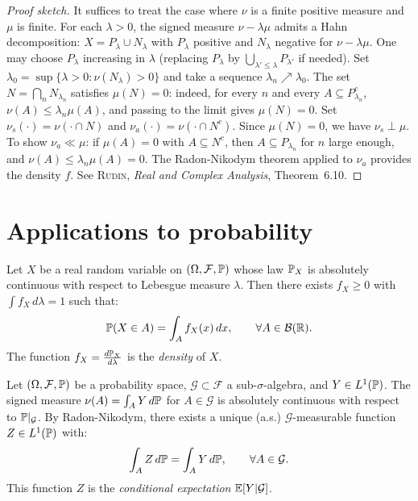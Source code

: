 \begin{proof}[Proof sketch]
It suffices to treat the case where $\nu$ is a finite positive measure and $\mu$ is
finite. For each $\lambda > 0$, the signed measure $\nu - \lambda\mu$ admits a Hahn
decomposition: $X = P_\lambda \cup N_\lambda$ with $P_\lambda$ positive and
$N_\lambda$ negative for $\nu - \lambda\mu$. One may choose $P_\lambda$ increasing in
$\lambda$ (replacing $P_\lambda$ by $\bigcup_{\lambda' \leq \lambda} P_{\lambda'}$ if
needed). Set $\lambda_0 = \sup\{\lambda > 0 : \nu(N_\lambda) > 0\}$ and take a
sequence $\lambda_n \nearrow \lambda_0$. The set $N = \bigcap_n N_{\lambda_n}$
satisfies $\mu(N) = 0$: indeed, for every $n$ and every $A \subseteq P_{\lambda_n}^c$,
$\nu(A) \leq \lambda_n \mu(A)$, and passing to the limit gives $\mu(N) = 0$.
Set $\nu_s(\cdot) = \nu(\cdot \cap N)$ and $\nu_a(\cdot) = \nu(\cdot \cap N^c)$.
Since $\mu(N) = 0$, we have $\nu_s \perp \mu$. To show $\nu_a \ll \mu$: if
$\mu(A) = 0$ with $A \subseteq N^c$, then $A \subseteq P_{\lambda_n}$ for $n$ large
enough, and $\nu(A) \leq \lambda_n \mu(A) = 0$. The Radon-Nikodym theorem applied to
$\nu_a$ provides the density $f$.
See \textsc{Rudin}, \emph{Real and Complex Analysis}, Theorem~6.10.
\end{proof}

\section{Applications to probability}

\begin{example}
Let $X$ be a real random variable on $(\Omega, \mathcal{F}, \mathbb{P})$ whose law $\mathbb{P}_X$
is absolutely continuous with respect to Lebesgue measure $\lambda$. Then there exists
$f_X \geq 0$ with $\int f_X\, d\lambda = 1$ such that:
\[
    \mathbb{P}(X \in A) = \int_A f_X(x)\, dx, \qquad \forall A \in \mathcal{B}(\mathbb{R}).
\]
The function $f_X = \frac{d\mathbb{P}_X}{d\lambda}$ is the \emph{density} of $X$.
\end{example}

\begin{example}
Let $(\Omega, \mathcal{F}, \mathbb{P})$ be a probability space,
$\mathcal{G} \subset \mathcal{F}$ a sub-$\sigma$-algebra, and $Y \in L^1(\mathbb{P})$.
The signed measure $\nu(A) = \int_A Y\, d\mathbb{P}$ for $A \in \mathcal{G}$ is absolutely
continuous with respect to $\mathbb{P}|_{\mathcal{G}}$. By Radon-Nikodym, there exists a
unique (a.s.) $\mathcal{G}$-measurable function $Z \in L^1(\mathbb{P})$ with:
\[
    \int_A Z\, d\mathbb{P} = \int_A Y\, d\mathbb{P}, \qquad \forall A \in \mathcal{G}.
\]
This function $Z$ is the \emph{conditional expectation} $\mathbb{E}[Y | \mathcal{G}]$.
\end{example}

